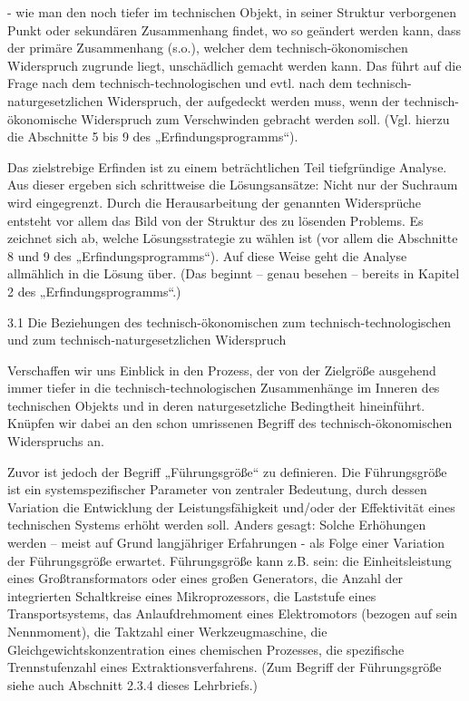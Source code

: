 \documentclass[12pt,a4paper]{article}
\begin{document}
- wie man den noch tiefer im technischen Objekt, in seiner Struktur verborgenen Punkt oder sekundären Zusammenhang findet, wo so geändert werden kann, dass der primäre Zusammenhang (s.o.), welcher dem technisch-ökonomischen Widerspruch zugrunde liegt, unschädlich gemacht werden kann. Das führt auf die Frage nach dem technisch-technologischen und evtl. nach dem technisch-naturgesetzlichen Widerspruch, der aufgedeckt werden muss, wenn der technisch-ökonomische Widerspruch zum Verschwinden gebracht werden soll. (Vgl. hierzu die Abschnitte 5 bis 9 des „Erfindungsprogramms“).

Das zielstrebige Erfinden ist zu einem beträchtlichen Teil tiefgründige Analyse. Aus dieser ergeben sich schrittweise die Lösungsansätze: Nicht nur der Suchraum wird eingegrenzt. Durch die Herausarbeitung der genannten Widersprüche entsteht vor allem das Bild von der Struktur des zu lösenden Problems. Es zeichnet sich ab, welche Lösungsstrategie zu wählen ist (vor allem die Abschnitte 8 und 9 des „Erfindungsprogramms“). Auf diese Weise geht die Analyse allmählich in die Lösung über. (Das beginnt – genau besehen – bereits in Kapitel 2 des „Erfindungsprogramms“.)


3.1  Die Beziehungen des technisch-ökonomischen zum technisch-technologischen und zum technisch-naturgesetzlichen Widerspruch

Verschaffen wir uns Einblick in den Prozess, der von der Zielgröße ausgehend immer tiefer in die technisch-technologischen Zusammenhänge im Inneren des technischen Objekts und in deren naturgesetzliche Bedingtheit hineinführt. Knüpfen wir dabei an den schon umrissenen Begriff des technisch-ökonomischen Widerspruchs an.

Zuvor ist jedoch der Begriff „Führungsgröße“ zu definieren. Die Führungsgröße ist ein systemspezifischer Parameter von zentraler Bedeutung, durch dessen Variation die Entwicklung der Leistungsfähigkeit und/oder der Effektivität eines technischen Systems erhöht werden soll. Anders gesagt: Solche Erhöhungen werden – meist auf Grund langjähriger Erfahrungen - als Folge einer Variation der Führungsgröße erwartet. Führungsgröße kann z.B. sein: die Einheitsleistung eines Großtransformators oder eines großen Generators, die Anzahl der integrierten Schaltkreise eines Mikroprozessors, die Laststufe eines Transportsystems, das Anlaufdrehmoment eines Elektromotors (bezogen auf sein Nennmoment), die Taktzahl einer Werkzeugmaschine, die Gleichgewichtskonzentration eines chemischen Prozesses, die spezifische Trennstufenzahl eines Extraktionsverfahrens. (Zum Begriff der Führungsgröße siehe auch Abschnitt 2.3.4 dieses Lehrbriefs.)
\end{document}
